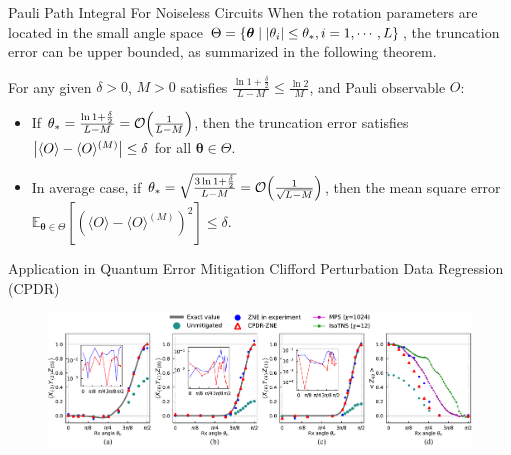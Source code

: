 \documentclass[10pt]{beamer}
\begin{document}
\begin{CJK}{UTF8}{gbsn}
 \begin{frame}[fragile]{Pauli Path Integral For Noiseless Circuits}
  When the rotation parameters are located in the small angle space $\Theta=\{\bm{\theta}\mid \abs{\theta_i}\leq \theta_* ,i=1,\cdots,L \}$, the truncation error can be upper bounded, as summarized in the following theorem. 
  \begin{mdframed}
    \begin{theorem}\label{thm:truncation_error}
      For any given $\delta>0$, $M>0$ satisfies $\frac{\ln{1+\frac{\delta}{2}}}{L-M}\leq \frac{\ln{2}}{M}$, and Pauli observable $O$:
    \begin{itemize}
      \item If $\theta_*=\frac{\ln{1+\frac{\delta}{2}}}{L-M}=\order{\frac{1}{L-M}}$, then the truncation error satisfies $\abs{\langle O \rangle - \langle O \rangle ^{(M)}}\leq \delta$ for all $\bm{\theta}\in \Theta$.
      \item In average case, if $\theta_*=\sqrt{\frac{3\ln{1+\frac{\delta}{2}}}{L-M}}=\order{\frac{1}{\sqrt{L-M}}}$, then the mean square error $\mathbb{E}_{\bm{\theta}\in \Theta}[(\langle O \rangle - \langle O \rangle ^{(M)})^2]\leq \delta$.
    \end{itemize} 
    \end{theorem}
  \end{mdframed}
  \vspace{0em}
\end{frame}

\begin{frame}[fragile]{Application in Quantum Error Mitigation}
  Clifford Perturbation Data Regression (CPDR) 
  \begin{figure}
    \centering
    \includegraphics[width=\textwidth]{fig/IBM_ans_v4.pdf}
  \end{figure}
\end{frame}



\end{CJK}
\end{document}
